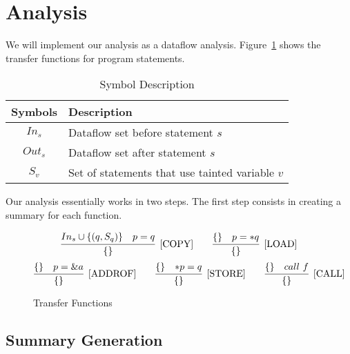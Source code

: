\section{Analysis}\label{analysis}

We will implement our analysis as a dataflow analysis.
Figure~\ref{fig:rules} shows the transfer functions
for program statements. 
\begin{table}[h!]
\begin{center}
\begin{tabular}{c|l}
Symbols & Description 	\\ \hline
\(In_s \)			& Dataflow set before statement $s$		\\	\hline
\(Out_s \)			& Dataflow set after statement $s$		\\  \hline
\(S_v \)			& Set of statements that use tainted variable $v$		\\
\end{tabular}
\caption{Symbol Description}
\end{center}
\end{table}

Our analysis essentially works in two steps. The
first step consists in creating a summary for each
function.


\begin{comment}
\begin{figure}[!h]
\begin{align*}
	s:& p &= q		& [\text{COPY}]		\\
	s:& p &= *q		& [\text{LOAD}]		\\
	s:& p &= \&a	& [\text{ADDROF}]	\\
    s:& *p &= q		& [\text{STORE}]	\\
    s:& call f&		& [\text{CALL}]		\\
\end{align*}
\caption{Transfer Functions}
\label{tab:rules}
\end{figure}
\end{comment}

\begin{figure}[!h]
\[
\infer[\COPY]
  {\set{}}
  {In_s \cup \set{(q, S_q)} & p = q}
\qquad
\infer[\LOAD]
  {\set{}}
  {\set{}   & p = *q}
\]
\[
\infer[\ADDROF]
  {\set{}}
  {\set{} & p = \&a}
\qquad  
\infer[\STORE]
  {\set{}}
  {\set{} & *p = q}
\qquad
\infer[\CALL]
  {\set{}}
  {\set{} & call\ f}  
\]
\caption{Transfer Functions}
\label{fig:rules}
\end{figure}

\subsection{Summary Generation}

